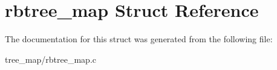 \hypertarget{structrbtree__map}{}\section{rbtree\+\_\+map Struct Reference}
\label{structrbtree__map}


The documentation for this struct was generated from the following file\+:\begin{DoxyCompactItemize}
\item 
tree\+\_\+map/rbtree\+\_\+map.\+c\end{DoxyCompactItemize}
